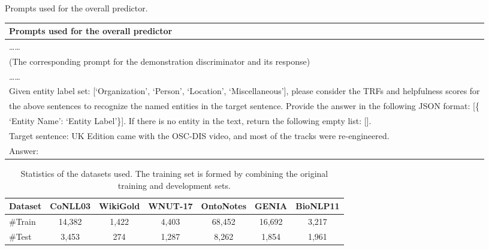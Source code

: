 \begin{prompt*}[t]
	\centering
	\caption{Prompts used for the overall predictor.}
	\label{tab:overall-predictor-chapter5}
	\begin{tabular}{l}
	\toprule
        Prompts used for the overall predictor \\
        \midrule
        \ldots\ldots\\
        (The corresponding prompt for the demonstration discriminator and its response) \\
        \ldots\ldots\\
        Given entity label set: {[}`Organization', `Person', `Location',  `Miscellaneous'{]}, please consider the TRFs and helpfulness scores for \\ the above sentences to recognize the named entities in the target sentence. Provide the answer in the following JSON format:  [\{\\`Entity Name': `Entity Label'\}]. If there is no entity in the text, return the following empty list: [].  
        \\
        Target sentence: UK Edition came with the OSC-DIS video, and most of the tracks were re-engineered.\\
        Answer: \\
        \bottomrule
	\end{tabular}
\end{prompt*}

\begin{table*}[h]
	\centering
 	\caption{Statistics of the datasets used. The training set is formed by combining the original training and development sets.}
	\begin{tabular}{l c c c c c c}
		\toprule
		\textbf{Dataset} & \textbf{CoNLL03} & \textbf{WikiGold} & \textbf{WNUT-17} & \textbf{OntoNotes} & \textbf{GENIA}  & \textbf{BioNLP11}    \\ \midrule
		\#Train & 14,382 & 1,422 & 4,403 & 68,452 & 16,692 & 3,217  \\ 
		\#Test & 3,453 & 274 & 1,287 & 8,262 & 1,854 & 1,961  \\
		\bottomrule
	\end{tabular}
	\label{tab:datasets-chapter5}
\end{table*}


